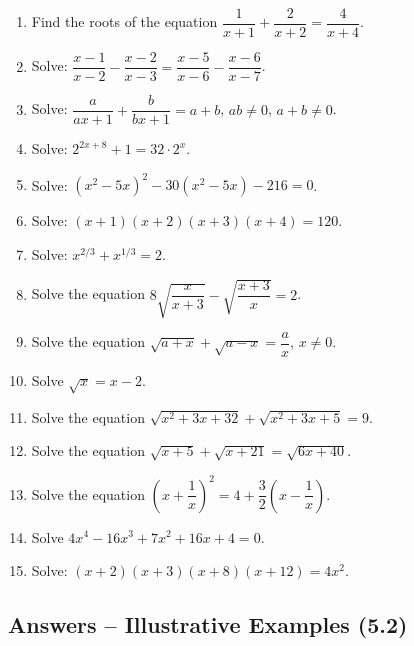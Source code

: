 \documentclass[12pt,a4paper]{article}
\begin{document}
\begin{enumerate}[label=Example \arabic*.]
    \item Find the roots of the equation \( \dfrac{1}{x+1} + \dfrac{2}{x+2} = \dfrac{4}{x+4} \).

    \item Solve: \( \dfrac{x-1}{x-2} - \dfrac{x-2}{x-3} = \dfrac{x-5}{x-6} - \dfrac{x-6}{x-7} \).

    \item Solve: \( \dfrac{a}{ax+1} + \dfrac{b}{bx+1} = a + b \), \( ab \neq 0 \), \( a + b \neq 0 \).

    \item Solve: \( 2^{2x+8} + 1 = 32 \cdot 2^x \).

    \item Solve: \( (x^2 - 5x)^2 - 30(x^2 - 5x) - 216 = 0 \).

    \item Solve: \( (x+1)(x+2)(x+3)(x+4) = 120 \).

    \item Solve: \( x^{2/3} + x^{1/3} = 2 \).

    \item Solve the equation \( 8 \sqrt{\dfrac{x}{x+3}} - \sqrt{\dfrac{x+3}{x}} = 2 \).

    \item Solve the equation \( \sqrt{a+x} + \sqrt{a-x} = \dfrac{a}{x} \), \( x \neq 0 \).

    \item Solve \( \sqrt{x} = x - 2 \).

    \item Solve the equation \( \sqrt{x^2 + 3x + 32} + \sqrt{x^2 + 3x + 5} = 9 \).

    \item Solve the equation \( \sqrt{x+5} + \sqrt{x+21} = \sqrt{6x+40} \).

    \item Solve the equation \( \left(x + \dfrac{1}{x}\right)^2 = 4 + \dfrac{3}{2}\left(x - \dfrac{1}{x}\right) \).

    \item Solve \( 4x^4 - 16x^3 + 7x^2 + 16x + 4 = 0 \).

    \item Solve: \( (x + 2)(x + 3)(x + 8)(x + 12) = 4x^2 \).
\end{enumerate}

\subsection{Answers -- Illustrative Examples (5.2)}
\end{document}
